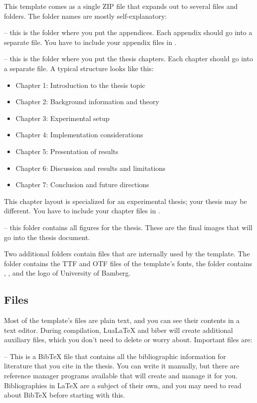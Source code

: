 This template comes as a single ZIP file that expands out to several files and folders. The folder names are mostly self-explanatory:

 -- this is the folder where you put the appendices. Each appendix should go into a separate  file. You have to include your appendix files in .

 -- this is the folder where you put the thesis chapters. Each chapter should go into a separate  file. A typical structure looks like this:
\begin{itemize}
\item Chapter 1: Introduction to the thesis topic
\item Chapter 2: Background information and theory
\item Chapter 3: Experimental setup
\item Chapter 4: Implementation considerations
\item Chapter 5: Presentation of results
\item Chapter 6: Discussion and results and limitations
\item Chapter 7: Conclusion and future directions
\end{itemize}

This chapter layout is specialized for an experimental thesis; your thesis may be different. You have to include your chapter files in .

 -- this folder contains all figures for the thesis. These are the final images that will go into the thesis document.

Two additional folders contain files that are internally used by the template. The folder  contains the TTF and OTF files of the template's fonts, the folder  contains , , and the logo of University of Bamberg.

\subsection{Files}

Most of the template's files are plain text, and you can see their contents in a text editor. During compilation, LuaLaTeX and biber will create additional auxiliary files, which you don't need to delete or worry about. Important files are:

 -- This is a BibTeX file that contains all the bibliographic information for literature that you cite in the thesis. You can write it manually, but there are reference manager programs available that will create and manage it for you. Bibliographies in LaTeX are a subject of their own, and you may need to read about BibTeX before starting with this.

